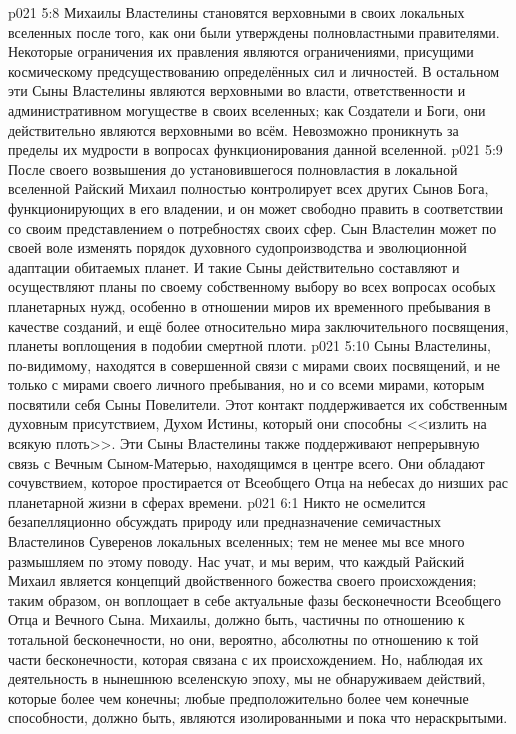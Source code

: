 \vs p021 5:8 \pc Михаилы Властелины становятся верховными в своих локальных вселенных после того, как они были утверждены полновластными правителями. Некоторые ограничения их правления являются ограничениями, присущими космическому предсуществованию определённых сил и личностей. В остальном эти Сыны Властелины являются верховными во власти, ответственности и административном могуществе в своих вселенных; как Создатели и Боги, они действительно являются верховными во всём. Невозможно проникнуть за пределы их мудрости в вопросах функционирования данной вселенной.
\vs p021 5:9 После своего возвышения до установившегося полновластия в локальной вселенной Райский Михаил полностью контролирует всех других Сынов Бога, функционирующих в его владении, и он может свободно править в соответствии со своим представлением о потребностях своих сфер. Сын Властелин может по своей воле изменять порядок духовного судопроизводства и эволюционной адаптации обитаемых планет. И такие Сыны действительно составляют и осуществляют планы по своему собственному выбору во всех вопросах особых планетарных нужд, особенно в отношении миров их временного пребывания в качестве созданий, и ещё более относительно мира заключительного посвящения, планеты воплощения в подобии смертной плоти.
\vs p021 5:10 Сыны Властелины, по\hyp{}видимому, находятся в совершенной связи с мирами своих посвящений, и не только с мирами своего личного пребывания, но и со всеми мирами, которым посвятили себя Сыны Повелители. Этот контакт поддерживается их собственным духовным присутствием, Духом Истины, который они способны <<излить на всякую плоть>>. Эти Сыны Властелины также поддерживают непрерывную связь с Вечным Сыном\hyp{}Матерью, находящимся в центре всего. Они обладают сочувствием, которое простирается от Всеобщего Отца на небесах до низших рас планетарной жизни в сферах времени.
\vs p021 6:1 Никто не осмелится безапелляционно обсуждать природу или предназначение семичастных Властелинов Суверенов локальных вселенных; тем не менее мы все много размышляем по этому поводу. Нас учат, и мы верим, что каждый Райский Михаил является  концепций двойственного божества своего происхождения; таким образом, он воплощает в себе актуальные фазы бесконечности Всеобщего Отца и Вечного Сына. Михаилы, должно быть, частичны по отношению к тотальной бесконечности, но они, вероятно, абсолютны по отношению к той части бесконечности, которая связана с их происхождением. Но, наблюдая их деятельность в нынешнюю вселенскую эпоху, мы не обнаруживаем действий, которые более чем конечны; любые предположительно более чем конечные способности, должно быть, являются изолированными и пока что нераскрытыми.

